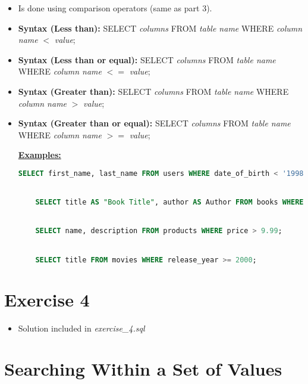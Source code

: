 \documentclass[12pt]{article}
\begin{document}
\begin{itemize}
    \item Is done using comparison operators (same as part 3).
    \item \textbf{Syntax (Less than):} SELECT \textit{columns} FROM \textit{table name} WHERE \textit{column name} $<$ \textit{value};
    \item \textbf{Syntax (Less than or equal):} SELECT \textit{columns} FROM \textit{table name} WHERE \textit{column name} $<=$ \textit{value};
    \item \textbf{Syntax (Greater than):} SELECT \textit{columns} FROM \textit{table name} WHERE \textit{column name} $>$ \textit{value};
    \item \textbf{Syntax (Greater than or equal):} SELECT \textit{columns} FROM \textit{table name} WHERE \textit{column name} $>=$ \textit{value};


    \bigskip

    \underline{\textbf{Examples:}}

    \bigskip

    \begin{lstlisting}[language=SQL]
    SELECT first_name, last_name FROM users WHERE date_of_birth < '1998-12-01';


    SELECT title AS "Book Title", author AS Author FROM books WHERE year_released <= 2015;


    SELECT name, description FROM products WHERE price > 9.99;


    SELECT title FROM movies WHERE release_year >= 2000;
    \end{lstlisting}

\end{itemize}

\bigskip

\section{Exercise 4}

\bigskip

\begin{itemize}
    \item Solution included in \textit{exercise\_4.sql}
\end{itemize}

\bigskip

\section{Searching Within a Set of Values}
\end{document}
